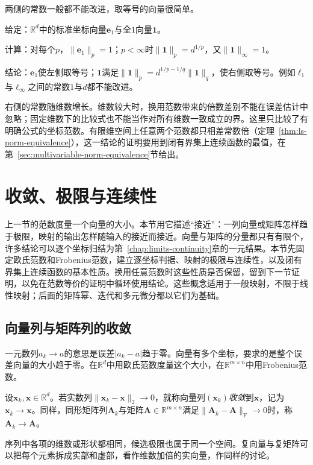 两侧的常数一般都不能改进，取等号的向量很简单。
\begin{example}[比较常数的取等]
\label{ex:ls-l1-linf-constants}
给定：$\mathbb R^d$中的标准坐标向量$\bm e_1$与全$1$向量$\bm 1$。

计算：对每个$p$，$\lVert\bm e_1\rVert_p=1$；$p<\infty$时$\lVert\bm 1\rVert_p=d^{1/p}$，又$\lVert\bm 1\rVert_\infty=1$。

结论：$\bm e_1$使左侧取等号；$\bm 1$满足$\lVert\bm 1\rVert_p=d^{1/p-1/q}\lVert\bm 1\rVert_q$，使右侧取等号。例如$\ell_1$与$\ell_\infty$之间的常数$1$与$d$都不能改进。
\end{example}
右侧的常数随维数增长。维数较大时，换用范数带来的倍数差别不能在误差估计中忽略；固定维数下的比较式也不能当作对所有维数一致成立的界。这里只比较了有明确公式的坐标范数。有限维空间上任意两个范数都只相差常数倍（定理~\ref{thm:ls-norm-equivalence}），这一结论的证明要用到闭有界集上连续函数的最值，在第~\ref{sec:multivariable-norm-equivalence}节给出。

\section{收敛、极限与连续性}
\label{sec:multivariable-limits-continuity}

上一节的范数度量一个向量的大小。本节用它描述“接近”：一列向量或矩阵怎样趋于极限，映射的输出怎样随输入的接近而接近。向量与矩阵的分量都只有有限个，许多结论可以逐个坐标归结为第~\ref{chap:limits-continuity}章的一元结果。本节先固定欧氏范数和Frobenius范数，建立逐坐标判据、映射的极限与连续性，以及闭有界集上连续函数的基本性质。换用任意范数时这些性质是否保留，留到下一节证明，以免在范数等价的证明中循环使用结论。这些概念适用于一般映射，不限于线性映射；后面的矩阵幂、迭代和多元微分都以它们为基础。

\subsection{向量列与矩阵列的收敛}
\label{sec:ls-finite-dimensional-sequences}

一元数列$a_k\to a$的意思是误差$|a_k-a|$趋于零。向量有多个坐标，要求的是整个误差向量的大小趋于零。在$\mathbb R^d$中用欧氏范数度量这个大小，在$\mathbb R^{m\times n}$中用Frobenius范数。
\begin{definition}[向量列与矩阵列的收敛]
\label{def:multivariable-sequence-convergence}
设$\bm x_k,\bm x\in\mathbb R^d$。若实数列$\lVert\bm x_k-\bm x\rVert_2\to0$，就称向量列$(\bm x_k)$\emph{收敛}到$\bm x$，记为$\bm x_k\to\bm x$。同样，同形矩阵列$\bm A_k$与矩阵$\bm A\in\mathbb R^{m\times n}$满足$\lVert\bm A_k-\bm A\rVert_{\mathrm F}\to0$时，称$\bm A_k\to\bm A$。
\end{definition}
序列中各项的维数或形状都相同，候选极限也属于同一个空间。复向量与复矩阵可以把每个元素拆成实部和虚部，看作维数加倍的实向量，作同样的讨论。


